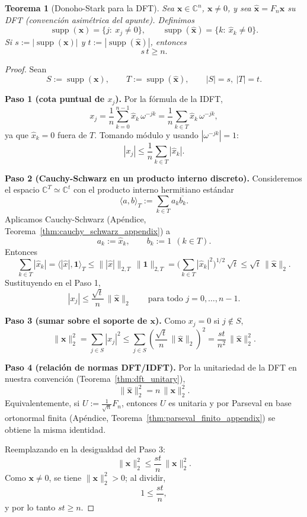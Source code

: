 \documentclass[a4paper,11pt]{report}
\newtheorem{theorem}{Teorema}[chapter]
\begin{document}
\begin{theorem}[Donoho-Stark para la DFT]
Sea $\mathbf{x}\in\mathbb{C}^n$, $\mathbf{x}\neq 0$, y sea $\widehat{\mathbf{x}}=F_n\mathbf{x}$ su DFT (convención asimétrica del apunte). Definimos
\[
\operatorname{supp}(\mathbf{x})=\{j:\ x_j\neq 0\},\qquad
\operatorname{supp}(\widehat{\mathbf{x}})=\{k:\ \widehat{x}_k\neq 0\}.
\]
Si $s:=|\operatorname{supp}(\mathbf{x})|$ y $t:=|\operatorname{supp}(\widehat{\mathbf{x}})|$, entonces
\[
s\,t\ge n.
\]
\end{theorem}
\begin{proof}
Sean
\[
S:=\operatorname{supp}(\mathbf{x}),\qquad T:=\operatorname{supp}(\widehat{\mathbf{x}}),
\qquad |S|=s,\ |T|=t.
\]

\textbf{Paso 1 (cota puntual de $x_j$).}
Por la fórmula de la IDFT,
\[
x_j=\frac1n\sum_{k=0}^{n-1}\widehat{x}_k\,\omega^{-jk}
=\frac1n\sum_{k\in T}\widehat{x}_k\,\omega^{-jk},
\]
ya que $\widehat{x}_k=0$ fuera de $T$. Tomando módulo y usando $|\omega^{-jk}|=1$:
\[
|x_j|\le \frac1n\sum_{k\in T}|\widehat{x}_k|.
\]

\textbf{Paso 2 (Cauchy-Schwarz en un producto interno discreto).}
Consideremos el espacio $\mathbb{C}^T\simeq\mathbb{C}^t$ con el producto interno hermitiano estándar
\[
\langle a,b\rangle_T:=\sum_{k\in T} a_k\overline{b_k}.
\]
Aplicamos Cauchy-Schwarz (Ap\'endice, Teorema~\ref{thm:cauchy_schwarz_appendix}) a
\[
a_k:=\widehat{x}_k,\qquad b_k:=1\ \ (k\in T).
\]
Entonces
\[
\sum_{k\in T}|\widehat{x}_k|=\langle |\widehat{x}|,\mathbf{1}\rangle_T
\le \||\widehat{x}|\|_{2,T}\,\|\mathbf{1}\|_{2,T}
=\Big(\sum_{k\in T}|\widehat{x}_k|^2\Big)^{1/2}\,\sqrt{t}
\le \sqrt{t}\,\|\widehat{\mathbf{x}}\|_2.
\]
Sustituyendo en el Paso 1,
\[
|x_j|\le \frac{\sqrt{t}}{n}\,\|\widehat{\mathbf{x}}\|_2
\qquad \text{para todo } j=0,\ldots,n-1.
\]

\textbf{Paso 3 (sumar sobre el soporte de $\mathbf{x}$).}
Como $x_j=0$ si $j\notin S$,
\[
\|\mathbf{x}\|_2^2
=\sum_{j\in S}|x_j|^2
\le \sum_{j\in S}\left(\frac{\sqrt{t}}{n}\,\|\widehat{\mathbf{x}}\|_2\right)^2
=\frac{st}{n^2}\,\|\widehat{\mathbf{x}}\|_2^2.
\]

\textbf{Paso 4 (relaci\'on de normas DFT/IDFT).}
Por la unitariedad de la DFT en nuestra convenci\'on (Teorema~\ref{thm:dft_unitary}),
\[
\|\widehat{\mathbf{x}}\|_2^2=n\,\|\mathbf{x}\|_2^2.
\]
Equivalentemente, si $U:=\frac1{\sqrt n}F_n$, entonces $U$ es unitaria y por Parseval en base ortonormal finita (Ap\'endice, Teorema~\ref{thm:parseval_finito_appendix}) se obtiene la misma identidad.

Reemplazando en la desigualdad del Paso 3:
\[
\|\mathbf{x}\|_2^2\le \frac{st}{n}\,\|\mathbf{x}\|_2^2.
\]
Como $\mathbf{x}\neq 0$, se tiene $\|\mathbf{x}\|_2^2>0$; al dividir,
\[
1\le \frac{st}{n},
\]
y por lo tanto $st\ge n$.
\end{proof}
\end{document}

